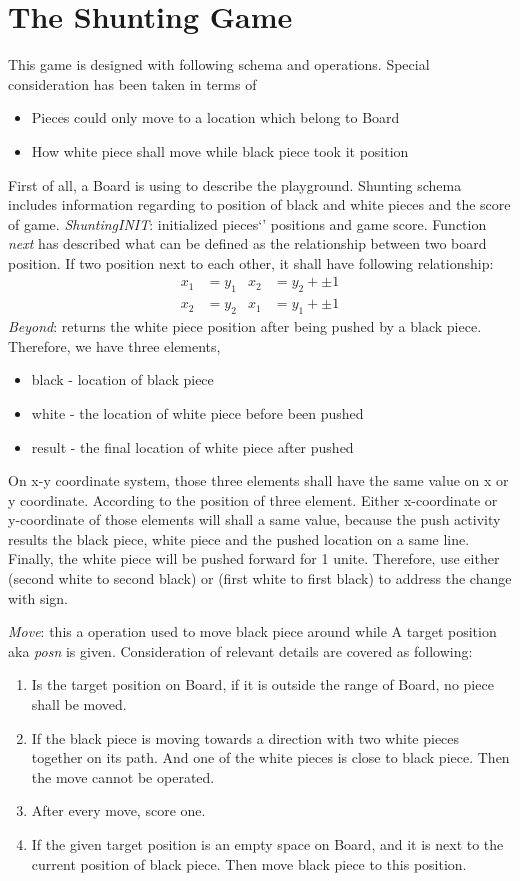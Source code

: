 \section{The Shunting Game}
This game is designed with following schema and operations. 
Special consideration has been taken in terms of \begin{itemize}
    \item Pieces could only move to a location which belong to Board
    \item How white piece shall move while black piece took it position
\end{itemize}
First of all, a Board is using to describe the playground. 
Shunting schema includes information regarding to position of black and white pieces and the score of game. 
\textit{ShuntingINIT}: initialized pieces\char`' positions and game score.
Function \textit{next} has described what can be defined as the relationship between two board position. If two position next to each other, it shall have following relationship:
\begin{align*}
x_1 &= y_1  &   x_2 &= y_2 + \pm1  \\
x_2 &= y_2  &   x_1 &= y_1+ \pm1
\end{align*}
\textit{Beyond}: returns the white piece position after being pushed by a black piece.
Therefore, we have three elements,
\begin{itemize}
    \item 	black - location of black piece
    \item 	white - the location of white piece before been pushed 
    \item 	result - the final location of white piece after pushed 
\end{itemize}

On x-y coordinate system, those three elements shall have the same value on x or y coordinate. According to the position of three element. Either x-coordinate or y-coordinate of those elements will shall a same value, because the push activity results the black piece, white piece and the pushed location on a same line. Finally, the white piece will be pushed forward for 1 unite. Therefore, use either (second white to second black) or (first white to first black) to address the change with \pm sign. 

\textit{Move}: this a operation used to move black piece around while A target position aka \textit{posn} is given. 
Consideration of relevant details are covered as following:
\begin{enumerate}
    \item 	Is the target position on Board, if it is outside the range of Board, no piece shall be moved. 
    \item 	If the black piece is moving towards a direction with two white pieces together on its path. And one of the white pieces is close to black piece. Then the move cannot be operated. 
    \item 	After every move, score one. 
    \item 	If the given target position is an empty space on Board, and it is next to the current position of black piece. Then move black piece to this position. 
\end{enumerate}

